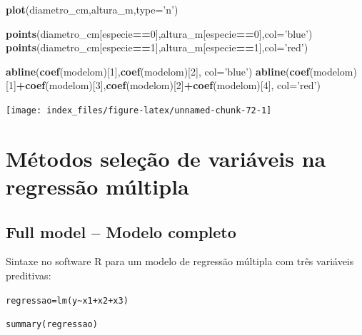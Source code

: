 \documentclass[12pt,brazil,oneside]{book}
\newenvironment{Shaded}{\begin{snugshade}}{\end{snugshade}}
\newcommand{\DataTypeTok}[1]{\textcolor[rgb]{0.13,0.29,0.53}{#1}}
\newcommand{\DecValTok}[1]{\textcolor[rgb]{0.00,0.00,0.81}{#1}}
\newcommand{\KeywordTok}[1]{\textcolor[rgb]{0.13,0.29,0.53}{\textbf{#1}}}
\newcommand{\NormalTok}[1]{#1}
\newcommand{\OperatorTok}[1]{\textcolor[rgb]{0.81,0.36,0.00}{\textbf{#1}}}
\newcommand{\StringTok}[1]{\textcolor[rgb]{0.31,0.60,0.02}{#1}}
\begin{document}
\begin{Shaded}
\begin{Highlighting}[]
\KeywordTok{plot}\NormalTok{(diametro_cm,altura_m,}\DataTypeTok{type=}\StringTok{'n'}\NormalTok{)}

\KeywordTok{points}\NormalTok{(diametro_cm[especie}\OperatorTok{==}\DecValTok{0}\NormalTok{],altura_m[especie}\OperatorTok{==}\DecValTok{0}\NormalTok{],}\DataTypeTok{col=}\StringTok{'blue'}\NormalTok{)}
\KeywordTok{points}\NormalTok{(diametro_cm[especie}\OperatorTok{==}\DecValTok{1}\NormalTok{],altura_m[especie}\OperatorTok{==}\DecValTok{1}\NormalTok{],}\DataTypeTok{col=}\StringTok{'red'}\NormalTok{)}

\KeywordTok{abline}\NormalTok{(}\KeywordTok{coef}\NormalTok{(modelom)[}\DecValTok{1}\NormalTok{],}\KeywordTok{coef}\NormalTok{(modelom)[}\DecValTok{2}\NormalTok{], }\DataTypeTok{col=}\StringTok{'blue'}\NormalTok{)}
\KeywordTok{abline}\NormalTok{(}\KeywordTok{coef}\NormalTok{(modelom)[}\DecValTok{1}\NormalTok{]}\OperatorTok{+}\KeywordTok{coef}\NormalTok{(modelom)[}\DecValTok{3}\NormalTok{],}\KeywordTok{coef}\NormalTok{(modelom)[}\DecValTok{2}\NormalTok{]}\OperatorTok{+}\KeywordTok{coef}\NormalTok{(modelom)[}\DecValTok{4}\NormalTok{], }\DataTypeTok{col=}\StringTok{'red'}\NormalTok{)}
\end{Highlighting}
\end{Shaded}

\begin{center}\texttt{[image: index\_files/figure-latex/unnamed-chunk-72-1]} \end{center}

\hypertarget{metodos-selecao-de-variaveis-na-regressao-multipla}{%
\section{Métodos seleção de variáveis na regressão múltipla}\label{metodos-selecao-de-variaveis-na-regressao-multipla}}

\hypertarget{full-model-modelo-completo}{%
\subsection{Full model -- Modelo completo}\label{full-model-modelo-completo}}

Sintaxe no software R para um modelo de regressão múltipla com três variáveis preditivas:

\texttt{regressao=lm(y\textasciitilde{}x1+x2+x3)}

\texttt{summary(regressao)}
\end{document}
